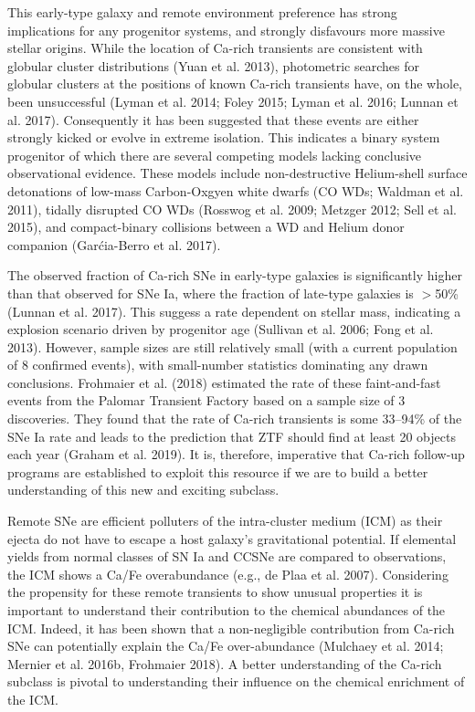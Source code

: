 \documentclass[11pt]{article}
\begin{document}
{This early-type galaxy and remote environment preference has strong implications for any progenitor systems, and strongly disfavours more massive stellar origins. While the location of Ca-rich transients are consistent with globular cluster distributions (Yuan et al. 2013), photometric searches for globular clusters at the positions of known Ca-rich transients have, on the whole, been unsuccessful (Lyman et al. 2014; Foley 2015; Lyman et al. 2016; Lunnan et al. 2017). Consequently it has been suggested that these events are either strongly kicked or evolve in extreme isolation. This indicates a binary system progenitor of which there are several competing models lacking conclusive observational evidence. These models include non-destructive Helium-shell surface detonations of low-mass Carbon-Oxgyen white dwarfs (CO WDs; Waldman et al. 2011), tidally disrupted CO WDs (Rosswog et al. 2009; Metzger 2012; Sell et al. 2015), and compact-binary collisions between a WD and Helium donor companion (Gar\'{c}ia-Berro et al. 2017).

The observed fraction of Ca-rich SNe in early-type galaxies is significantly higher than that observed for SNe Ia, where the fraction of late-type galaxies is ${>}$50\% (Lunnan et al. 2017).  This suggess a rate dependent on stellar mass, indicating a explosion scenario driven by progenitor age (Sullivan et al. 2006; Fong et al. 2013). However, sample sizes are still relatively small (with a current population of 8 confirmed events), with small-number statistics dominating any drawn conclusions. Frohmaier et al. (2018) estimated the rate of these faint-and-fast events from the Palomar Transient Factory based on a sample size of 3 discoveries. They found that the rate of Ca-rich transients is some 33--94\% of the SNe Ia rate and leads to the prediction that ZTF should find at least 20 objects each year (Graham et al. 2019). It is, therefore, imperative that Ca-rich follow-up programs are established to exploit this resource if we are to build a better understanding of this new and exciting subclass.

Remote SNe are efficient polluters of the intra-cluster medium (ICM) as their ejecta do not have to escape a host galaxy's gravitational potential. If elemental yields from normal classes of SN Ia and CCSNe are compared to observations, the ICM shows a Ca/Fe overabundance (e.g., de Plaa et al. 2007). Considering the propensity for these remote transients to show unusual properties it is important to understand their contribution to the chemical abundances of the ICM. Indeed, it has been shown that a non-negligible contribution from Ca-rich SNe can potentially explain the Ca/Fe over-abundance (Mulchaey et al. 2014; Mernier et al. 2016b, Frohmaier 2018). A better understanding of the Ca-rich subclass is pivotal to understanding their influence on the chemical enrichment of the ICM.

}
\end{document}
